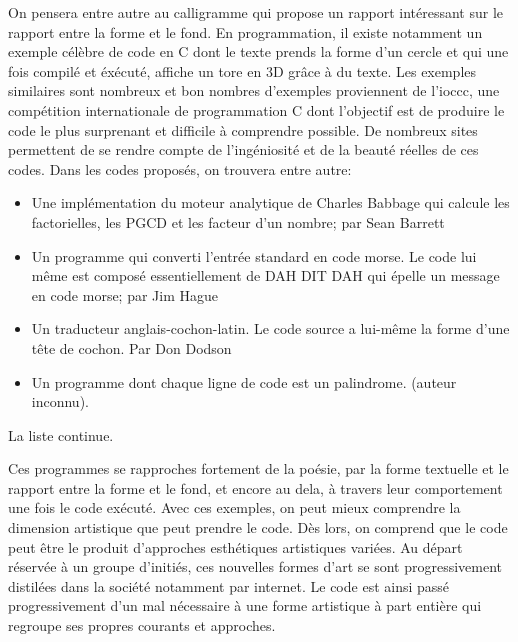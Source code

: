 \documentclass[12pt]{article} %
\begin{document}
On pensera entre autre au \gls{calligramme} qui propose un rapport intéressant sur le rapport entre la forme et le fond. En programmation, il existe notamment un exemple célèbre de code en C dont le texte prends la forme d'un cercle et qui une fois compilé et éxécuté, affiche un tore en 3D grâce à du texte. Les exemples similaires sont nombreux et bon nombres d'exemples proviennent de l'\acrshort{ioccc}, une compétition internationale de programmation C dont l'objectif est de produire le code le plus surprenant et difficile à comprendre possible. De nombreux sites permettent de se rendre compte de l'ingéniosité et de la beauté réelles de ces codes. Dans les codes proposés, on trouvera entre autre:
\begin{itemize}
    \item Une implémentation du moteur analytique de Charles Babbage qui calcule les factorielles, les PGCD et les facteur d'un nombre; par Sean Barrett \cite{SBarrett-Babble}
    \item Un programme qui converti l'entrée standard en code morse. Le code lui même est composé essentiellement de DAH DIT DAH qui épelle un message en code morse; par Jim Hague \cite{JHague-morse}
    \item Un traducteur anglais-cochon-latin. Le code source a lui-même la forme d'une tête de cochon. Par Don Dodson \cite{DDodson-piglatin}
    \item Un programme dont chaque ligne de code est un \gls{palindrome}. (auteur inconnu). 
\end{itemize}
La liste continue. 

Ces programmes se rapproches fortement de la poésie, par la forme textuelle et le rapport entre la forme et le fond, et encore au dela, à travers leur comportement une fois le code exécuté. Avec ces exemples, on peut mieux comprendre la dimension artistique que peut prendre le code. Dès lors, on comprend que le code peut être le produit d'approches esthétiques artistiques variées. Au départ réservée à un groupe d'initiés, ces nouvelles formes d'art se sont progressivement distilées dans la société notamment par internet. Le code est ainsi passé progressivement d'un mal nécessaire à une forme artistique à part entière qui regroupe ses propres courants et approches.
\end{document}
